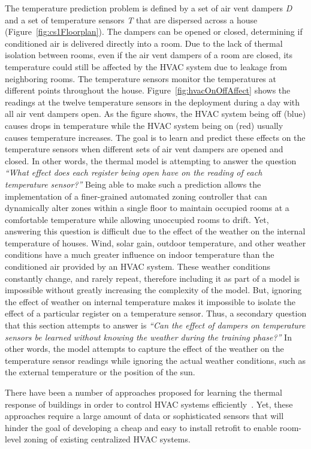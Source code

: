 The temperature prediction problem is defined by a set of air vent dampers {\em
D} and a set of temperature sensors {\em T} that are dispersed across a house
(Figure~\ref{fig:cs1Floorplan}). The dampers can be opened or closed,
determining if conditioned air is delivered directly into a room. Due to the
lack of thermal isolation between rooms, even if the air vent dampers of a room
are closed, its temperature could still be affected by the HVAC system due to
leakage from neighboring rooms. The temperature sensors monitor the temperatures
at different points throughout the house. Figure~\ref{fig:hvacOnOffAffect} shows
the readings at the twelve temperature sensors in the deployment during a day
with all air vent dampers open. As the figure shows, the HVAC system being off
(blue) causes drops in temperature while the HVAC system being on (red) usually
causes temperature increases. The goal is to learn and predict these effects on
the temperature sensors when different sets of air vent dampers are opened and
closed. In other words, the thermal model is attempting to answer the question
{\em ``What effect does each register being open have on the reading of each
temperature sensor?''}  Being able to make such a prediction allows the
implementation of a finer-grained automated zoning controller that can
dynamically alter zones within a single floor to maintain occupied rooms at a
comfortable temperature while allowing unoccupied rooms to drift. Yet, answering
this question is difficult due to the effect of the weather on the internal
temperature of houses. Wind, solar gain, outdoor temperature, and other weather
conditions have a much greater influence on indoor temperature than the
conditioned air provided by an HVAC system. These weather conditions constantly
change, and rarely repeat, therefore including it as part of a model is
impossible without greatly increasing the complexity of the model. But, ignoring
the effect of weather on internal temperature makes it impossible to isolate the
effect of a particular register on a temperature sensor. Thus, a secondary
question that this section attempts to answer is {\em ``Can the effect of
dampers on temperature sensors be learned without knowing the weather during the
training phase?''} In other words, the model attempts to capture the effect of
the weather on the temperature sensor readings while ignoring the actual weather
conditions, such as the external temperature or the position of the sun.

There have been a number of approaches proposed for learning the thermal
response of buildings in order to control HVAC systems
efficiently~\cite{Henze2004,Deng2010,Oldewurtel2010,Ma2011,Nghiem2011,Aswani2011}. Yet,
these approaches require a large amount of data or sophisticated sensors that
will hinder the goal of developing a cheap and easy to install retrofit to
enable room-level zoning of existing centralized HVAC systems.

